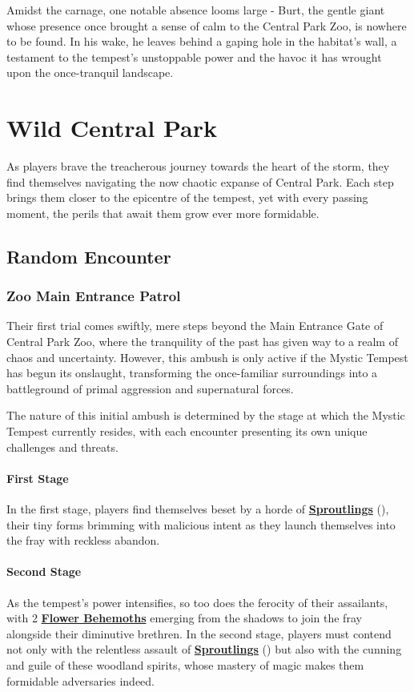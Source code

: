 Amidst the carnage, one notable absence looms large - Burt, the gentle giant whose presence once brought a sense of calm to the Central Park Zoo, is nowhere to be found. In his wake, he leaves behind a gaping hole in the habitat's wall, a testament to the tempest's unstoppable power and the havoc it has wrought upon the once-tranquil landscape.

\section*{Wild Central Park}
As players brave the treacherous journey towards the heart of the storm, they find themselves navigating the now chaotic expanse of Central Park. Each step brings them closer to the epicentre of the tempest, yet with every passing moment, the perils that await them grow ever more formidable.

\subsection*{Random Encounter}
\subsubsection*{Zoo Main Entrance Patrol}
Their first trial comes swiftly, mere steps beyond the Main Entrance Gate of Central Park Zoo, where the tranquility of the past has given way to a realm of chaos and uncertainty. However, this ambush is only active if the Mystic Tempest has begun its onslaught, transforming the once-familiar surroundings into a battleground of primal aggression and supernatural forces.

The nature of this initial ambush is determined by the stage at which the Mystic Tempest currently resides, with each encounter presenting its own unique challenges and threats.\\

\paragraph*{First Stage}
In the first stage, players find themselves beset by a horde of \hyperref[sec:Sproutling]{\textbf{Sproutlings}} (), their tiny forms brimming with malicious intent as they launch themselves into the fray with reckless abandon.\\

\paragraph*{Second Stage}
As the tempest's power intensifies, so too does the ferocity of their assailants, with 2 \hyperref[sec:FlowerBehemoth]{\textbf{Flower Behemoths}} emerging from the shadows to join the fray alongside their diminutive brethren. In the second stage, players must contend not only with the relentless assault of \hyperref[sec:Sproutling]{\textbf{Sproutlings}} () but also with the cunning and guile of these woodland spirits, whose mastery of magic makes them formidable adversaries indeed.\\

